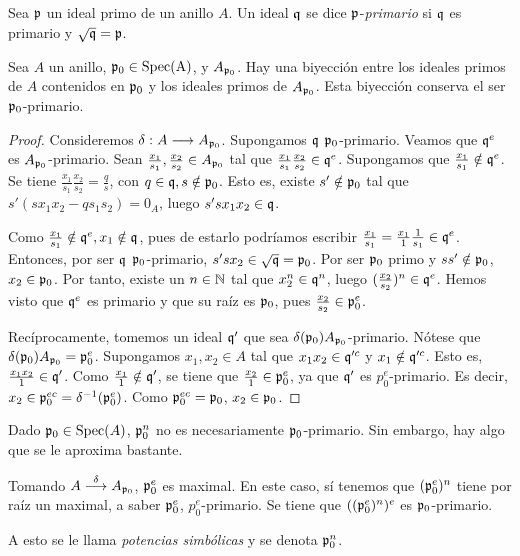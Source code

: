 \documentclass[../main.tex]{subfiles}
\begin{document}
\begin{definition}
Sea $\mathfrak{p}$ un ideal primo de un anillo $A$. Un ideal $\mathfrak{q}$ se dice $\mathfrak{p}$-\textit{primario} si $\mathfrak{q}$ es primario y $\sqrt{\mathfrak{q}}=\mathfrak{p}$.
\end{definition}

\begin{proposition}
Sea $A$ un anillo, $\mathfrak{p}_0\in \operatorname{Spec(A)}$, y $A_{\mathfrak{p}_0}$. Hay una biyección entre los ideales primos de $A$ contenidos en $\mathfrak{p}_0$ y los ideales primos de $A_{\mathfrak{p}_0}$. Esta biyección conserva el ser $\mathfrak{p}_0$-primario.
\end{proposition}
\begin{proof}
Consideremos $\delta:A\longrightarrow A_{\mathfrak{p}_0}$. Supongamos $\mathfrak{q}$ $\mathfrak{p}_0$-primario. Veamos que $\mathfrak{q}^e$ es $A_{\mathfrak{p}_0}$-primario. Sean $\frac{x_1}{s_1},\frac{x_2}{s_2}\in A_{\mathfrak{p}_0}$ tal que $\frac{x_1}{s_1}\frac{x_2}{s_2}\in\mathfrak{q}^e$. Supongamos que $\frac{x_1}{s_1}\notin\mathfrak{q}^e$. Se tiene $\frac{x_1}{s_1}\frac{x_2}{s_2}=\frac{q}{s}$, con $q\in\mathfrak{q}, s\notin\mathfrak{p}_0$. Esto es, existe $s'\notin\mathfrak{p}_0$ tal que $s'(sx_1x_2-qs_1s_2)=0_A$, luego $s'sx_1x_2\in\mathfrak{q}$.

Como $\frac{x_1}{s_1}\notin \mathfrak{q}^e, x_1\notin\mathfrak{q}$, pues de estarlo podríamos escribir $\frac{x_1}{s_1}=\frac{x_1}{1}\frac{1}{s_1}\in\mathfrak{q}^e$. Entonces, por ser $\mathfrak{q}$ $\mathfrak{p}_0$-primario, $s'sx_2\in\sqrt{\mathfrak{q}}=\mathfrak{p}_0$. Por ser $\mathfrak{p}_0$ primo y $ss'\notin\mathfrak{p}_0$, $x_2\in\mathfrak{p}_0$. Por tanto, existe un $n\in\mathbb{N}$ tal que $x_2^n\in\mathfrak{q}^n$, luego $(\frac{x_2}{s_2})^n\in\mathfrak{q}^e$. Hemos visto que $\mathfrak{q}^e$ es primario y que su raíz es $\mathfrak{p}_0$, pues $\frac{x_2}{s_2}\in\mathfrak{p}_0^e$.

Recíprocamente, tomemos un ideal $\mathfrak{q}'$ que sea $\delta(\mathfrak{p}_0)A_{\mathfrak{p}_0}$-primario. Nótese que $\delta(\mathfrak{p}_0)A_{\mathfrak{p}_0}=\mathfrak{p}_0^e$. Supongamos $x_1,x_2\in A$ tal que $x_1x_2\in\mathfrak{q}'^c$ y $x_1\notin\mathfrak{q}'^c$. Esto es, $\frac{x_1x_2}{1}\in\mathfrak{q}'$. Como $\frac{x_1}{1}\notin\mathfrak{q}'$, se tiene que $\frac{x_2}{1}\in\mathfrak{p}_0^e$, ya que $\mathfrak{q}'$ es $p_0^e$-primario. Es decir, $x_2\in\mathfrak{p}_0^{ec}= \delta^{-1}(\mathfrak{p}_0^e)$. Como $\mathfrak{p}_0^{ec}=\mathfrak{p}_0$, $x_2\in\mathfrak{p}_0$.
\end{proof}
\begin{remark}
Dado $\mathfrak{p}_0\in\operatorname{Spec}(A)$, $\mathfrak{p}_0^n$ no es necesariamente $\mathfrak{p}_0$-primario. Sin embargo, hay algo que se le aproxima bastante.

Tomando $A\overset{\delta}{\longrightarrow}A_{\mathfrak{p}_0}$, $\mathfrak{p}_0^e$ es maximal. En este caso, sí tenemos que $(\mathfrak{p}_0^e)^n$ tiene por raíz un maximal, a saber $\mathfrak{p}_0^e$, $p_0^e$-primario. Se tiene que $((\mathfrak{p}_0^e)^n)^e$ es $\mathfrak{p}_0$-primario.

A esto se le llama \textit{potencias simbólicas} y se denota $\mathfrak{p}_0^n$.
\end{remark}
\end{document}
